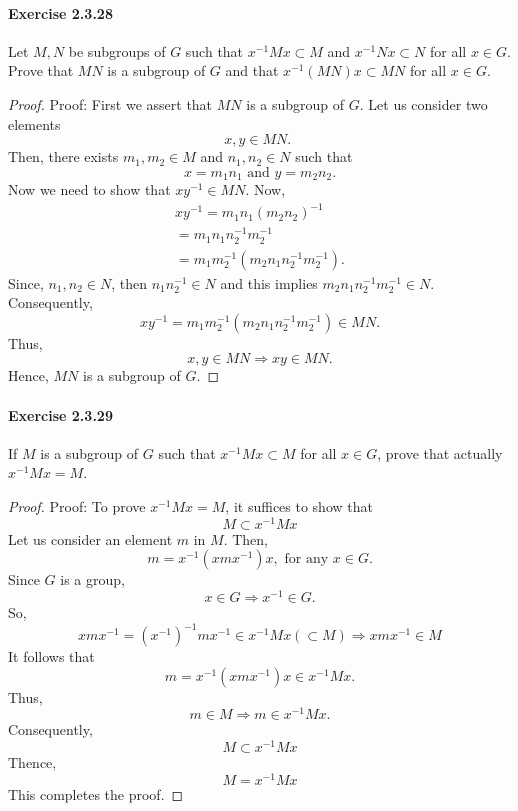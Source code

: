 \documentclass{article}
\begin{document}
\paragraph{Exercise 2.3.28} Let $M, N$ be subgroups of $G$ such that $x^{-1}Mx \subset M$ and $x^{-1} N x \subset N$ for all $x \in G$. Prove that $MN$ is a subgroup of $G$ and that $x^{-1} (MN)x \subset MN$ for all $x \in G$.
\begin{proof}
    Proof: First we assert that $M N$ is a subgroup of $G$. Let us consider two elements
$$
x, y \in M N \text {. }
$$
Then, there exists $m_1, m_2 \in M$ and $n_1, n_2 \in N$ such that
$$
x=m_1 n_1 \text { and } y=m_2 n_2 .
$$
Now we need to show that $x y^{-1} \in M N$. Now,
$$
\begin{gathered}
x y^{-1}=m_1 n_1\left(m_2 n_2\right)^{-1} \\
=m_1 n_1 n_2^{-1} m_2^{-1} \\
=m_1 m_2^{-1}\left(m_2 n_1 n_2^{-1} m_2^{-1}\right) .
\end{gathered}
$$
Since,
$n_1, n_2 \in N$, then $n_1 n_2^{-1} \in N$ and this implies $m_2 n_1 n_2^{-1} m_2^{-1} \in N$.
Consequently,
$$
x y^{-1}=m_1 m_2^{-1}\left(m_2 n_1 n_2^{-1} m_2^{-1}\right) \in M N .
$$
Thus,
$$
x, y \in M N \Longrightarrow x y \in M N .
$$
Hence, $M N$ is a subgroup of $G$.
\end{proof}


\paragraph{Exercise 2.3.29} If $M$ is a subgroup of $G$ such that $x^{-1}Mx \subset M$ for all $x \in G$, prove that actually $x^{-1}Mx = M$.
\begin{proof}
    Proof: To prove $x^{-1} M x=M$, it suffices to show that
$$
M \subset x^{-1} M x
$$
Let us consider an element $m$ in $M$. Then,
$$
m=x^{-1}\left(x m x^{-1}\right) x, \text { for any } x \in G .
$$
Since $G$ is a group,
$$
x \in G \Longrightarrow x^{-1} \in G .
$$
So,
$$
x m x^{-1}=\left(x^{-1}\right)^{-1} m x^{-1} \in x^{-1} M x(\subset M) \Longrightarrow x m x^{-1} \in M
$$
It follows that
$$
m=x^{-1}\left(x m x^{-1}\right) x \in x^{-1} M x .
$$
Thus,
$$
m \in M \Longrightarrow m \in x^{-1} M x .
$$
Consequently,
$$
M \subset x^{-1} M x
$$
Thence,
$$
M=x^{-1} M x
$$
This completes the proof.
\end{proof}
\end{document}
